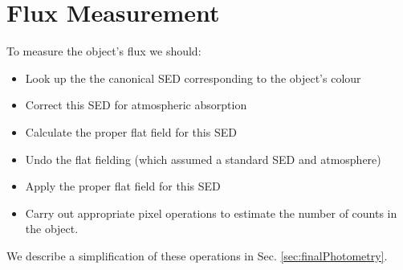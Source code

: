 \documentclass[12pt]{article}
\newcommand{\secRef}[1]{Sec. \ref{sec:#1}}
\begin{document}

\section{Flux Measurement}
\label{app:properFluxMeasurement}

To measure the object's flux we should:
\begin{itemize}
\item Look up the the canonical SED corresponding to the object's colour
\item Correct this SED for atmospheric absorption
\item Calculate the proper flat field for this SED
\item Undo the flat fielding (which assumed a standard SED and atmosphere)
\item Apply the proper flat field for this SED
\item Carry out appropriate pixel operations to estimate the number of counts in the object.
\end{itemize}

We describe a simplification of these operations in \secRef{finalPhotometry}.


\end{document}
